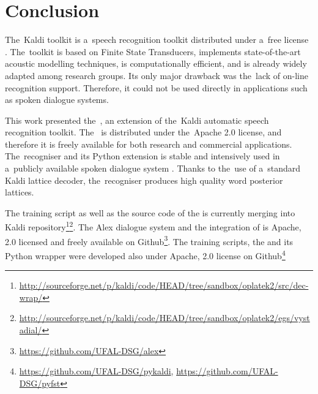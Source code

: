 \chapter{Conclusion}
\label{cha:conclusion}


The~Kaldi toolkit is a~speech recognition toolkit distributed under a~free license \cite{povey2011kaldi}.
The~toolkit is based on Finite State Transducers, implements state-of-the-art acoustic modelling techniques, is computationally efficient, and is already widely adapted among research groups.
Its only major drawback was the~lack of on-line recognition support.
Therefore, it could not be used directly in applications such as spoken dialogue systems.

This work presented the~, an extension of the~Kaldi automatic speech recognition toolkit.
The~ is distributed under the~Apache 2.0 license, and therefore it is freely available for both research and commercial applications.
The~recogniser and its Python extension is stable and intensively used in a~publicly available spoken dialogue system \cite{ptics2014url}.
Thanks to the~use of a~standard Kaldi lattice decoder, the~recogniser produces high quality word posterior lattices.


The training script as well as the source code of the  is currently merging into Kaldi repository\footnote{\url{http://sourceforge.net/p/kaldi/code/HEAD/tree/sandbox/oplatek2/src/dec-wrap/}}\footnote{\url{http://sourceforge.net/p/kaldi/code/HEAD/tree/sandbox/oplatek2/egs/vystadial/}}.
The Alex dialogue system and the integration of  is Apache, 2.0 licensed and freely available on Github\footnote{\url{https://github.com/UFAL-DSG/alex}}.
The training scripts, the  and its Python wrapper  were developed also under Apache, 2.0 license on Github\footnote{\url{https://github.com/UFAL-DSG/pykaldi}, \url{https://github.com/UFAL-DSG/pyfst}} 

